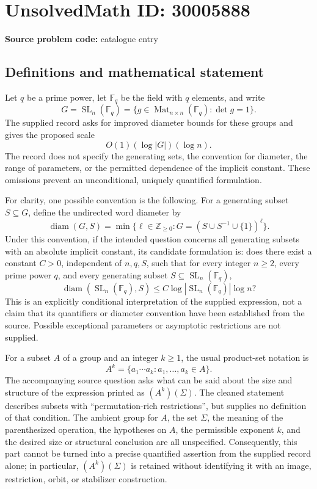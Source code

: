 \documentclass[11pt]{article}
\newcommand{\Z}{\mathbb{Z}}
\newcommand{\F}{\mathbb{F}}
\begin{document}
\section*{UnsolvedMath ID: 30005888}
\textbf{Source problem code:} catalogue entry
\subsection{Definitions and mathematical statement}
Let \(q\) be a prime power, let \(\F_q\) be the field with \(q\) elements, and write
\[
G=\operatorname{SL}_n(\F_q)=\{g\in\operatorname{Mat}_{n\times n}(\F_q):\det g=1\}.
\]
The supplied record asks for improved diameter bounds for these groups and gives the proposed scale
\[
O(1)(\log |G|)(\log n).
\]
The record does not specify the generating sets, the convention for diameter, the range of parameters, or the permitted dependence of the implicit constant. These omissions prevent an unconditional, uniquely quantified formulation.

For clarity, one possible convention is the following. For a generating subset \(S\subseteq G\), define the undirected word diameter by
\[
\operatorname{diam}(G,S)=\min\{\ell\in\Z_{\geq0}:G=(S\cup S^{-1}\cup\{1\})^\ell\}.
\]
Under this convention, if the intended question concerns all generating subsets with an absolute implicit constant, its candidate formulation is: does there exist a constant \(C>0\), independent of \(n,q,S\), such that for every integer \(n\geq2\), every prime power \(q\), and every generating subset \(S\subseteq\operatorname{SL}_n(\F_q)\),
\[
\operatorname{diam}(\operatorname{SL}_n(\F_q),S)
\leq C\log|\operatorname{SL}_n(\F_q)|\log n?
\]
This is an explicitly conditional interpretation of the supplied expression, not a claim that its quantifiers or diameter convention have been established from the source. Possible exceptional parameters or asymptotic restrictions are not supplied.

For a subset \(A\) of a group and an integer \(k\geq1\), the usual product-set notation is
\[
A^k=\{a_1\cdots a_k:a_1,\ldots,a_k\in A\}.
\]
The accompanying source question asks what can be said about the size and structure of the expression printed as \((A^k)(\Sigma)\). The cleaned statement describes subsets with ``permutation-rich restrictions'', but supplies no definition of that condition. The ambient group for \(A\), the set \(\Sigma\), the meaning of the parenthesized operation, the hypotheses on \(A\), the permissible exponent \(k\), and the desired size or structural conclusion are all unspecified. Consequently, this part cannot be turned into a precise quantified assertion from the supplied record alone; in particular, \((A^k)(\Sigma)\) is retained without identifying it with an image, restriction, orbit, or stabilizer construction.
\end{document}
